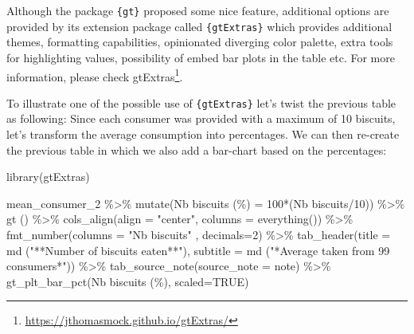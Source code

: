 \documentclass[
]{krantz}
\makeatletter
\newenvironment{Shaded}{\begin{snugshade}}{\end{snugshade}}
\newcommand{\AttributeTok}[1]{\textcolor[rgb]{0.61,0.61,0.61}{#1}}
\newcommand{\ConstantTok}[1]{\textcolor[rgb]{0,0,0}{#1}}
\newcommand{\DecValTok}[1]{\textcolor[rgb]{0.06,0.06,0.06}{#1}}
\newcommand{\FunctionTok}[1]{\textcolor[rgb]{0,0,0}{#1}}
\newcommand{\NormalTok}[1]{#1}
\newcommand{\OtherTok}[1]{\textcolor[rgb]{0.37,0.37,0.37}{#1}}
\newcommand{\SpecialCharTok}[1]{\textcolor[rgb]{0,0,0}{#1}}
\newcommand{\StringTok}[1]{\textcolor[rgb]{0.5,0.5,0.5}{#1}}
\renewcommand{\href}[2]{#2\footnote{\url{#1}}}
\newenvironment{kframe}{%
\medskip{}
\setlength{\fboxsep}{.8em}
 \def\at@end@of@kframe{}%
 \ifinner\ifhmode%
  \def\at@end@of@kframe{\end{minipage}}%
  \begin{minipage}{\columnwidth}%
 \fi\fi%
 \def\FrameCommand##1{\hskip\@totalleftmargin \hskip-\fboxsep
 \colorbox{shadecolor}{##1}\hskip-\fboxsep
     \hskip-\linewidth \hskip-\@totalleftmargin \hskip\columnwidth}%
 \MakeFramed {\advance\hsize-\width
   \@totalleftmargin\z@ \linewidth\hsize
   \@setminipage}}%
 {\par\unskip\endMakeFramed%
 \at@end@of@kframe}
\renewenvironment{Shaded}{\begin{kframe}}{\end{kframe}}
\makeatother
\begin{document}
Although the package \texttt{\{gt\}} proposed some nice feature, additional options are provided by its extension package called \texttt{\{gtExtras\}} which provides additional themes, formatting capabilities, opinionated diverging color palette, extra tools for highlighting values, possibility of embed bar plots in the table etc. For more information, please check \href{https://jthomasmock.github.io/gtExtras/}{gtExtras}.

To illustrate one of the possible use of \texttt{\{gtExtras\}} let's twist the previous table as following: Since each consumer was provided with a maximum of 10 biscuits, let's transform the average consumption into percentages. We can then re-create the previous table in which we also add a bar-chart based on the percentages:

\begin{Shaded}
\begin{Highlighting}[]
\FunctionTok{library}\NormalTok{(gtExtras)}

\NormalTok{mean\_consumer\_2 }\SpecialCharTok{\%\textgreater{}\%}
  \FunctionTok{mutate}\NormalTok{(}\StringTok{\textasciigrave{}}\AttributeTok{Nb biscuits (\%)}\StringTok{\textasciigrave{}} \OtherTok{=} \DecValTok{100}\SpecialCharTok{*}\NormalTok{(}\StringTok{\textasciigrave{}}\AttributeTok{Nb biscuits}\StringTok{\textasciigrave{}}\SpecialCharTok{/}\DecValTok{10}\NormalTok{)) }\SpecialCharTok{\%\textgreater{}\%} 
  \FunctionTok{gt}\NormalTok{ () }\SpecialCharTok{\%\textgreater{}\%}
  \FunctionTok{cols\_align}\NormalTok{(}\AttributeTok{align =} \StringTok{"center"}\NormalTok{, }\AttributeTok{columns =} \FunctionTok{everything}\NormalTok{()) }\SpecialCharTok{\%\textgreater{}\%}
  \FunctionTok{fmt\_number}\NormalTok{(}\AttributeTok{columns =} \StringTok{"Nb biscuits"}\NormalTok{ , }\AttributeTok{decimals=}\DecValTok{2}\NormalTok{) }\SpecialCharTok{\%\textgreater{}\%}
  \FunctionTok{tab\_header}\NormalTok{(}\AttributeTok{title =} \FunctionTok{md}\NormalTok{ (}\StringTok{"**Number of biscuits eaten**"}\NormalTok{), }
             \AttributeTok{subtitle =} \FunctionTok{md}\NormalTok{ (}\StringTok{"*Average taken from 99 consumers*"}\NormalTok{)) }\SpecialCharTok{\%\textgreater{}\%}
  \FunctionTok{tab\_source\_note}\NormalTok{(}\AttributeTok{source\_note =}\NormalTok{ note) }\SpecialCharTok{\%\textgreater{}\%} 
  \FunctionTok{gt\_plt\_bar\_pct}\NormalTok{(}\StringTok{\textasciigrave{}}\AttributeTok{Nb biscuits (\%)}\StringTok{\textasciigrave{}}\NormalTok{, }\AttributeTok{scaled=}\ConstantTok{TRUE}\NormalTok{)}
\end{Highlighting}
\end{Shaded}
\end{document}
